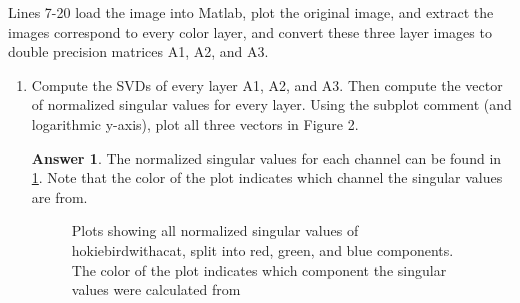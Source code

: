 \documentclass{article}
\theoremstyle{definition}
\newtheorem*{answer}{Answer}
\begin{document}
\begin{enumerate}[leftmargin=\labelsep]
	      Lines 7-20 load the image into Matlab, plot the original image, and extract the images correspond to every color layer, and convert these three layer images to double precision matrices A1, A2, and A3.
	      \begin{enumerate}
		      \item Compute the SVDs of every layer A1, A2, and A3. Then compute the vector of normalized singular values for every layer. Using the subplot comment (and logarithmic y-axis), plot all three vectors in Figure 2.
		            \begin{answer}
			            The normalized singular values for each channel can be found in \cref{fig:birdsingvals}. Note that the color of the plot indicates which channel the singular values are from.
			            \begin{figure}[H]
				            \centering{}
				            \caption{Plots showing all normalized singular values of hokiebirdwithacat, split into red, green, and blue components. The color of the plot indicates which component the singular values were calculated from}
				            \label{fig:birdsingvals}
			            \end{figure}
		            \end{answer}


\end{enumerate}
\end{enumerate}
\end{document}
